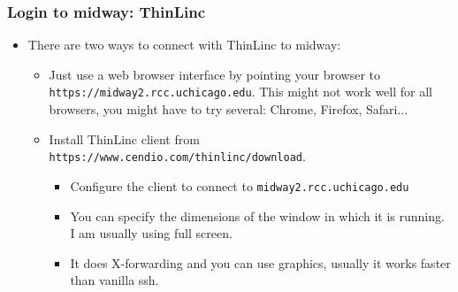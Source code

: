 \begin{frame}[fragile]
  \frametitle{Login to midway: ThinLinc}
  \begin{itemize}
    \item There are two ways to connect with ThinLinc to midway:
      \begin{itemize}
        \item Just use a web browser interface by pointing your browser to {\color{mycolorcli}\verb|https://midway2.rcc.uchicago.edu|}. 
          This might not work well for all browsers, you might have to try several: Chrome, Firefox, Safari...
        \item Install ThinLinc client from {\color{mycolorcli}\verb|https://www.cendio.com/thinlinc/download|}. 
          \begin{itemize}
          \item Configure the client to connect to {\color{mycolorcli}\verb|midway2.rcc.uchicago.edu|}
          \item You can specify the dimensions of the window in which it is running. I am usually using full screen.
          \item It does X-forwarding and you can use graphics, usually it works faster than vanilla ssh.
          \end{itemize}
      \end{itemize}
  \end{itemize}
\end{frame}
